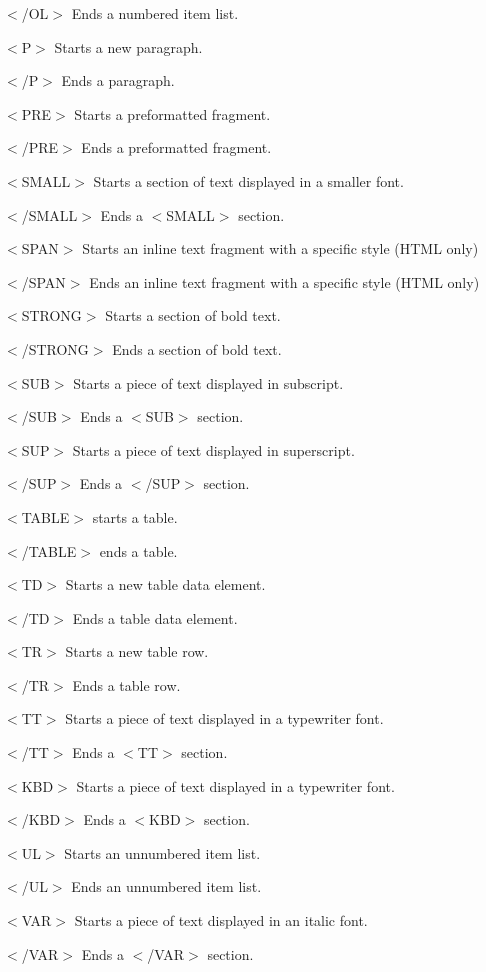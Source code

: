 \begin{DoxyItemize}
\item {\ttfamily $<$/OL$>$} Ends a numbered item list. 
\item {\ttfamily $<$P$>$} Starts a new paragraph. 
\item {\ttfamily $<$/P$>$} Ends a paragraph. 
\item {\ttfamily $<$PRE$>$} Starts a preformatted fragment. 
\item {\ttfamily $<$/PRE$>$} Ends a preformatted fragment. 
\item {\ttfamily $<$SMALL$>$} Starts a section of text displayed in a smaller font. 
\item {\ttfamily $<$/SMALL$>$} Ends a {\ttfamily $<$SMALL$>$} section. 
\item {\ttfamily $<$SPAN$>$} Starts an inline text fragment with a specific style (HTML only) 
\item {\ttfamily $<$/SPAN$>$} Ends an inline text fragment with a specific style (HTML only) 
\item {\ttfamily $<$STRONG$>$} Starts a section of bold text. 
\item {\ttfamily $<$/STRONG$>$} Ends a section of bold text. 
\item {\ttfamily $<$SUB$>$} Starts a piece of text displayed in subscript. 
\item {\ttfamily $<$/SUB$>$} Ends a {\ttfamily $<$SUB$>$} section. 
\item {\ttfamily $<$SUP$>$} Starts a piece of text displayed in superscript. 
\item {\ttfamily $<$/SUP$>$} Ends a {\ttfamily $<$/SUP$>$} section. 
\item {\ttfamily $<$TABLE$>$} starts a table. 
\item {\ttfamily $<$/TABLE$>$} ends a table. 
\item {\ttfamily $<$TD$>$} Starts a new table data element. 
\item {\ttfamily $<$/TD$>$} Ends a table data element. 
\item {\ttfamily $<$TR$>$} Starts a new table row. 
\item {\ttfamily $<$/TR$>$} Ends a table row. 
\item {\ttfamily $<$TT$>$} Starts a piece of text displayed in a typewriter font. 
\item {\ttfamily $<$/TT$>$} Ends a {\ttfamily $<$TT$>$} section. 
\item {\ttfamily $<$KBD$>$} Starts a piece of text displayed in a typewriter font. 
\item {\ttfamily $<$/KBD$>$} Ends a {\ttfamily $<$KBD$>$} section. 
\item {\ttfamily $<$UL$>$} Starts an unnumbered item list. 
\item {\ttfamily $<$/UL$>$} Ends an unnumbered item list. 
\item {\ttfamily $<$VAR$>$} Starts a piece of text displayed in an italic font. 
\item {\ttfamily $<$/VAR$>$} Ends a {\ttfamily $<$/VAR$>$} section. 
\end{DoxyItemize}

